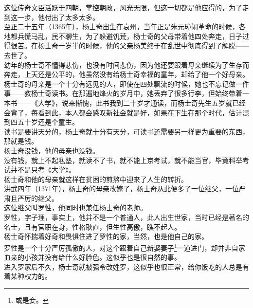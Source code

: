 \begin{multicols}{\theparacolNo}
这位传奇文臣活跃于四朝，掌控朝政，风光无限，但这一切都是他应得的，为了走到这一步，他付出了太多太多。\\

至正二十五年（1365年），杨士奇出生在袁州，当年正是朱元璋闹革命的时候，各地都兵慌马乱，民不聊生，为了躲避饥荒，杨士奇的父母带着他四处奔走，日子过得很苦。在杨士奇一岁半的时候，他的父亲杨美终于在乱世中彻底得到了解脱——去世了。\\

幼年的杨士奇不懂得悲伤，也没有时间悲伤，因为他还要跟着母亲继续为了生存而奔走，上天还是公平的，他虽然没有给杨士奇幸福的童年，却给了他一个好母亲。\\

杨士奇的母亲是一个十分有远见的人，即使在四处飘流的时候，她也不忘记做一件事——教杨士奇读书。在那遍地烽火的岁月中，她丢弃了很多行李，但始终带着一本书——《大学》，说来惭愧，此书我到二十岁才通读，而杨士奇先生五岁就已经会背了，每看到此，本人都会感叹新社会就是好，如果在下生在那个时代，估计混到四五十岁还是个童生。\\

读书是要讲天分的，杨士奇就十分有天分，可读书还需要另一样更为重要的东西，那就是钱。\\

杨士奇没钱，他的母亲也没钱。\\

没有钱，就上不起私塾，就读不了书，就不能上京考试，就不能当官，毕竟科举考试并不是只考《大学》。\\

杨士奇和他的母亲就这样在贫困的煎熬中迎来了人生的转折。\\

洪武四年（1371年），杨士奇的母亲改嫁了，杨士奇从此便多了一位继父，一位严肃且严厉的继父。\\

这位继父叫罗性，他同时也兼任杨士奇的老师。\\

罗性，字子理，事实上，他并不是一个普通人，此人出生世家，当时已经是著名的名士，且有官职在身，性格耿直，但生性高傲，瞧不起人。\\

杨士奇怀揣着好奇和畏惧住进了罗性的家，当然，也是他自己的家。\\

罗性是一个十分严厉孤傲的人，对这个跟着自己新娶妻子\footnote{或是妾。}一道进门，却并非自家血亲的小孩并没有给什么好脸色。这似乎也是很自然的事。\\

进入罗家后不久，杨士奇就被强令改姓罗，这似乎也很正常，给你饭吃的人总是有着某种权力的。\\


\end{multicols}
